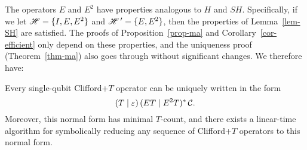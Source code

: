 The operators $E$ and $E^2$ have properties analogous to $H$ and $SH$. Specifically, if we let $\mathscr{H}
= \{I,E,E^2\}$ and $\mathscr{H}\,' = \{E,E^2\}$, then the properties of Lemma~\ref{lem-SH} are satisfied. The
proofs of Proposition~\ref{prop-ma} and Corollary~\ref{cor-efficient} only depend on these
properties, and the uniqueness proof (Theorem~\vref{thm-ma}) also goes through without significant
changes. We therefore have:

\begin{proposition}
  Every single-qubit Clifford+$T$ operator can be uniquely written in the form
  \begin{equation}\label{eqn-et}
    (T\mid\varepsilon)\,(ET\mid E^2T)^*\,{{\mathcal C}}.
  \end{equation}
  Moreover, this normal form has minimal $T$-count, and there exists a linear-time algorithm for
  symbolically reducing any sequence of Clifford+$T$ operators to this normal form.
\end{proposition}


